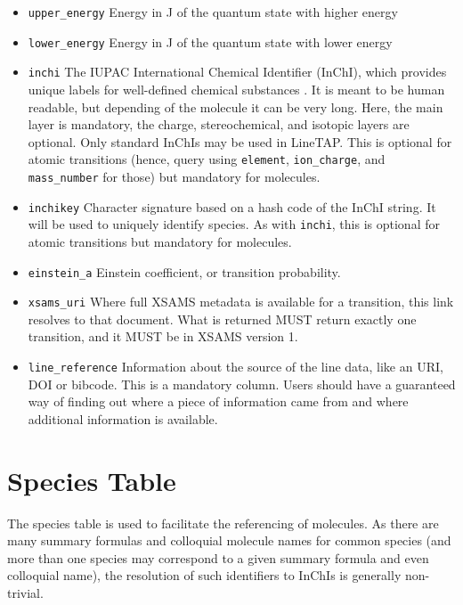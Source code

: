 \documentclass[11pt,a4paper]{ivoa}
\begin{document}
\begin{itemize}
\item \texttt{upper\_energy} Energy  in J of the quantum state
with higher energy

\item \texttt{lower\_energy} Energy  in J of the quantum state
with lower energy

\item \texttt{inchi} The IUPAC International Chemical Identifier
(InChI), which  provides unique labels for well-defined chemical
substances \citep{INCHI}. It is meant to be human readable, but
depending of the molecule it can be very long.  Here, the main layer is
mandatory, the charge, stereochemical, and isotopic layers are optional.
Only standard InChIs may be used in LineTAP.  This is optional for
atomic transitions (hence, query using \texttt{element},
\texttt{ion\_charge}, and \texttt{mass\_number} for those) but mandatory
for molecules.

\item \texttt{inchikey} Character signature based on a hash code of
the InChI string. It will be used to uniquely identify species.  As with
\texttt{inchi}, this is optional for atomic transitions but mandatory
for molecules.

\item \texttt{einstein\_a} Einstein coefficient, or transition probability.

\item \texttt{xsams\_uri} Where full XSAMS metadata is available for a
transition, this link resolves to that document. What is returned MUST
return exactly one transition, and it MUST be in XSAMS version 1.

\item \texttt{line\_reference} Information about the source of the line data,
like an URI, DOI or bibcode.  This is a mandatory column.  Users should
have a guaranteed way of finding out where a piece of information came
from and where additional information is available.

\end{itemize}

\section{Species Table}\label{sect:speciestable}
\label{ref:speciestable}

The species table is used to facilitate the referencing of molecules. As
there are many summary formulas and colloquial molecule names for common
species (and more than one species may correspond to a given summary
formula and even colloquial name), the resolution of such identifiers to
InChIs is generally non-trivial.
\end{document}
